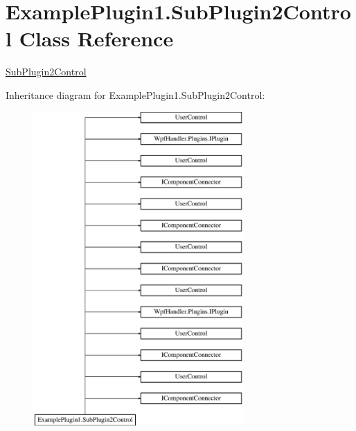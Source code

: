 \hypertarget{class_example_plugin1_1_1_sub_plugin2_control}{}\section{Example\+Plugin1.\+Sub\+Plugin2\+Control Class Reference}
\label{class_example_plugin1_1_1_sub_plugin2_control}


\mbox{\hyperlink{class_example_plugin1_1_1_sub_plugin2_control}{Sub\+Plugin2\+Control}}  


Inheritance diagram for Example\+Plugin1.\+Sub\+Plugin2\+Control\+:\begin{figure}[H]
\begin{center}
\leavevmode
\includegraphics[height=12.000000cm]{d3/dc3/class_example_plugin1_1_1_sub_plugin2_control}
\end{center}
\end{figure}
